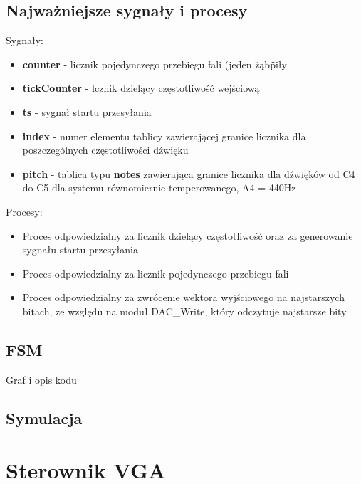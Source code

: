 \documentclass[a4paper]{report}
\begin{document}
		\subsection{Najważniejsze sygnały i procesy}
		{\Large Sygnały:}
			\begin{itemize}
				\item \textbf{counter} - licznik pojedynczego przebiegu fali (jeden \"ząb\" piły
				\item \textbf{tickCounter} - lcznik dzielący częstotliwość wejściową
				\item \textbf{ts} - sygnał startu przesyłania
				\item \textbf{index} - numer elementu tablicy zawierającej granice licznika dla poszczególnych częstotliwości dźwięku
				\item \textbf{pitch} - tablica typu \textbf{notes} zawierająca granice licznika dla dźwięków od C4 do C5 dla systemu równomiernie temperowanego, A4 = 440Hz
			\end{itemize}
		{\Large Procesy:}
			\begin{itemize}
			\item Proces odpowiedzialny za licznik dzielący częstotliwość oraz za generowanie sygnału startu przesyłania\\
						
			\item Proces odpowiedzialny za licznik pojedynczego przebiegu fali\\
									
			\item Proces odpowiedzialny za zwrócenie wektora wyjściowego na najstarszych bitach, ze względu na moduł DAC\_Write, który odczytuje najstarsze bity\\
									
			\end{itemize}
		\subsection{FSM}
		Graf i opis kodu
		\subsection{Symulacja}
	\section{Sterownik VGA}
\end{document}
